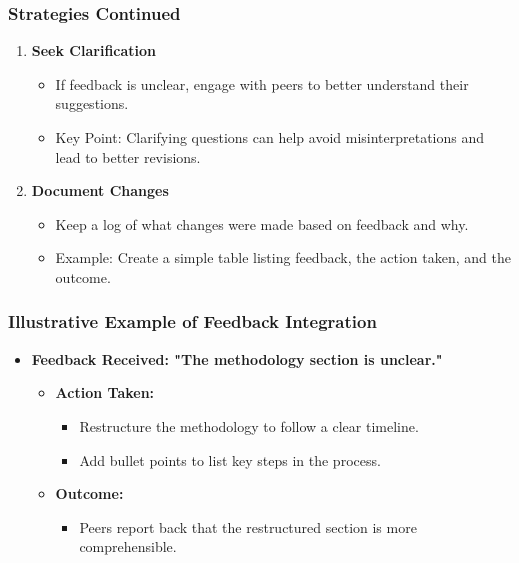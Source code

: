 \documentclass[aspectratio=169]{beamer}
\begin{document}
\begin{frame}[fragile]
    \frametitle{Strategies Continued}
    \begin{enumerate}[resume]
        \item \textbf{Seek Clarification}
            \begin{itemize}
                \item If feedback is unclear, engage with peers to better understand their suggestions.
                \item Key Point: Clarifying questions can help avoid misinterpretations and lead to better revisions.
            \end{itemize}

        \item \textbf{Document Changes}
            \begin{itemize}
                \item Keep a log of what changes were made based on feedback and why.
                \item Example: Create a simple table listing feedback, the action taken, and the outcome.
            \end{itemize}
    \end{enumerate}
\end{frame}

\begin{frame}[fragile]
    \frametitle{Illustrative Example of Feedback Integration}
    \begin{itemize}
        \item \textbf{Feedback Received: "The methodology section is unclear."}
        \begin{itemize}
            \item \textbf{Action Taken:}
            \begin{itemize}
                \item Restructure the methodology to follow a clear timeline.
                \item Add bullet points to list key steps in the process.
            \end{itemize}
            \item \textbf{Outcome:}
            \begin{itemize}
                \item Peers report back that the restructured section is more comprehensible.
            \end{itemize}
        \end{itemize}
    \end{itemize}
\end{frame}
\end{document}
